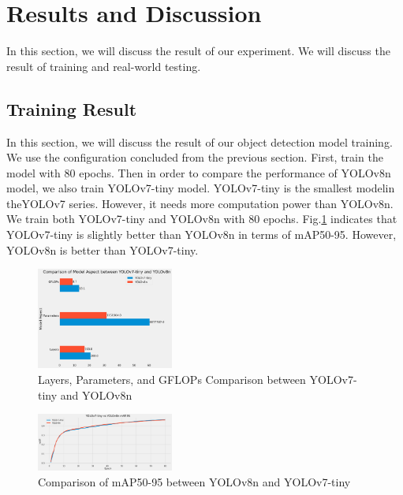 \documentclass[conference]{IEEEtran}
\begin{document}
\section{Results and Discussion}
In this section, we will discuss the result of our experiment. We will discuss  the result of training and real-world testing.
\subsection{Training Result}
In this section, we will discuss the result of our object detection model training. We use the configuration concluded from the previous section. First, train the model with 80 epochs.
Then in order to compare the performance of YOLOv8n model, we also train YOLOv7-tiny model.
YOLOv7-tiny is the smallest modelin theYOLOv7 series. However, it needs more computation power than YOLOv8n. We train both YOLOv7-tiny and YOLOv8n with 80 epochs.
Fig.\ref{fig:mAP_comparison} indicates that YOLOv7-tiny is slightly better than YOLOv8n in terms of mAP50-95. However, YOLOv8n is better than YOLOv7-tiny.
\begin{figure}
\centering
\includegraphics[width=0.4\textwidth,keepaspectratio]{YOLOv7-tinyvsYOLOv8n_model_aspect.png}    
\caption{Layers, Parameters, and GFLOPs Comparison between YOLOv7-tiny and YOLOv8n}
\end{figure}

\begin{figure}[h]
\centering
\includegraphics[width=0.4\textwidth,keepaspectratio]{YOLOv7-tinyvsYOLOv8n.png}
\caption{Comparison of mAP50-95 between YOLOv8n and YOLOv7-tiny}
\label{fig:mAP_comparison}
\end{figure}
\end{document}
